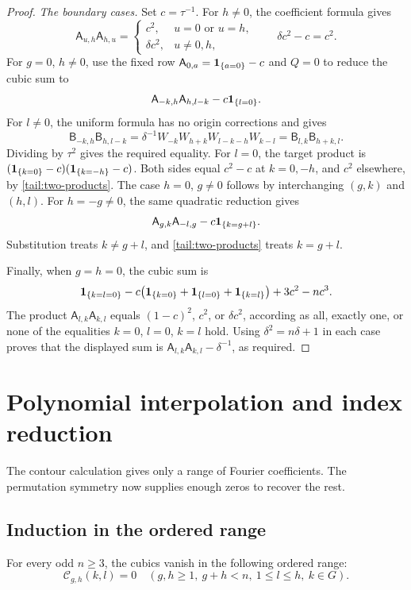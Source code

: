 \begin{proof}
\emph{The boundary cases.}
Set $c=\tau^{-1}$. For $h\ne0$, the coefficient formula gives
\begin{equation}\label{tail:two-products}
 \mathsf A_{u,h}\mathsf A_{h,u}=
 \begin{cases}
 c^2,&u=0\text{ or }u=h,\\
 \delta c^2,&u\ne0,h,
 \end{cases}
 \qquad \delta c^2-c=c^2.
\end{equation}
For $g=0$, $h\ne0$, use the fixed row
$\mathsf A_{0,a}=\mathbf1_{\{a=0\}}-c$ and $Q=0$ to reduce the cubic sum to
\[
 \mathsf A_{-k,h}\mathsf A_{h,l-k}-c\mathbf1_{\{l=0\}}.
\]
For $l\ne0$, the uniform formula has no origin corrections and gives
\[
 \mathsf B_{-k,h}\mathsf B_{h,l-k}
 =\delta^{-1}W_{-k}W_{h+k}W_{l-k-h}W_{k-l}
 =\mathsf B_{l,k}\mathsf B_{h+k,l}.
\]
Dividing by $\tau^2$ gives the required equality.
For $l=0$, the target product is
$(\mathbf1_{\{k=0\}}-c)(\mathbf1_{\{k=-h\}}-c)$.
Both sides equal $c^2-c$ at $k=0,-h$, and $c^2$ elsewhere,
by \eqref{tail:two-products}.
The case $h=0$, $g\ne0$ follows by interchanging $(g,k)$ and $(h,l)$.
For $h=-g\ne0$, the same quadratic reduction gives
\[
 \mathsf A_{g,k}\mathsf A_{-l,g}-c\mathbf1_{\{k=g+l\}}.
\]
Substitution treats $k\ne g+l$, and \eqref{tail:two-products}
treats $k=g+l$.

Finally, when $g=h=0$, the cubic sum is
\[
 \mathbf1_{\{k=l=0\}}
 -c\bigl(\mathbf1_{\{k=0\}}+\mathbf1_{\{l=0\}}+\mathbf1_{\{k=l\}}\bigr)
 +3c^2-nc^3.
\]
The product $\mathsf A_{l,k}\mathsf A_{k,l}$ equals
$(1-c)^2$, $c^2$, or $\delta c^2$, according as all, exactly one,
or none of the equalities $k=0$, $l=0$, $k=l$ hold.
Using $\delta^2=n\delta+1$ in each case proves that the displayed
sum is $\mathsf A_{l,k}\mathsf A_{k,l}-\delta^{-1}$, as required.
\end{proof}

\section{Polynomial interpolation and index reduction}
\label{tail:completion}

The contour calculation gives only a range of Fourier coefficients.
The permutation symmetry now supplies enough zeros to recover the rest.

\subsection{Induction in the ordered range}

\begin{proposition}\label{tail:ordered}
For every odd $n\ge3$, the cubics vanish in the following ordered range:
\[
 \mathcal C_{g,h}(k,l)=0\quad
 (g,h\ge1,\ g+h<n,\ 1\le l\le h,\ k\in G).
\]
\end{proposition}

